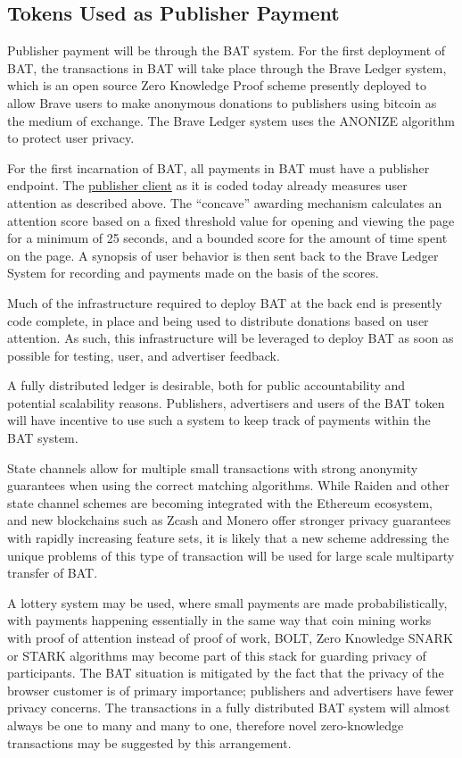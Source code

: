 \documentclass[11pt]{article}
\begin{document}
\subsection{Tokens Used as Publisher Payment}
\label{sec-4-3}

Publisher payment will be through the \textrm{BAT} system. For the first deployment of \textrm{BAT}, the transactions in \textrm{BAT} will take place through the Brave Ledger system, which is an open source Zero Knowledge Proof scheme presently deployed to allow Brave users to make anonymous donations to publishers using bitcoin as the medium of exchange.  The Brave Ledger system uses the ANONIZE\cite{13} algorithm to protect user privacy. 

For the first incarnation of \textrm{BAT}, all payments in \textrm{BAT} must have a publisher endpoint. The \href{https://github.com/brave/ledger-publisher}{publisher client} as it is coded today already measures user attention as described above. The ``concave'' awarding mechanism calculates an attention score based on a fixed threshold value for opening and viewing the page for a minimum of 25 seconds, and a bounded score for the amount of time spent on the page. A synopsis of user behavior is then sent back to the Brave Ledger System for recording and payments made on the basis of the scores.

Much of the infrastructure required to deploy \textrm{BAT} at the back end is presently code complete, in place and being used to distribute donations based on user attention. As such, this infrastructure will be leveraged to deploy \textrm{BAT} as soon as possible for testing, user, and advertiser feedback.

A fully distributed ledger is desirable, both for public accountability and potential scalability reasons. Publishers, advertisers and users of the \textrm{BAT} token will have incentive to use such a system to keep track of payments within the \textrm{BAT} system. 

State channels allow for multiple small transactions with strong anonymity guarantees when using the correct matching algorithms. While Raiden and other state channel schemes are becoming integrated with the Ethereum ecosystem, and new blockchains such as Zcash and Monero offer stronger privacy guarantees with rapidly increasing feature sets, it is likely that a new scheme addressing the unique problems of this type of transaction will be used for large scale multiparty transfer of \textrm{BAT}.

 A lottery system may be used, where small payments are made probabilistically, with payments happening essentially in the same way that coin mining works with proof of attention instead of proof of work\cite{14,15}, BOLT\cite{16}, Zero Knowledge SNARK\cite{17} or STARK\cite{18} algorithms may become part of this stack for guarding privacy of participants. The \textrm{BAT} situation is mitigated by the fact that the privacy of the browser customer is of primary importance; publishers and advertisers have fewer privacy concerns. The transactions in a fully distributed \textrm{BAT} system will almost always be one to many and many to one, therefore novel zero-knowledge transactions may be suggested by this arrangement.
\end{document}
